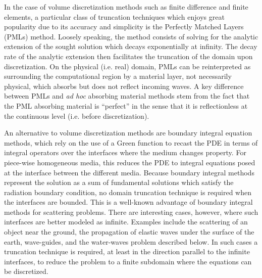 \documentclass[11pt]{article}
\begin{document}
In the case of volume discretization methods such as finite difference and
finite elements, a particular class of truncation techniques which enjoys great
popularity due to its accuracy and simplicity is the Perfectly Matched Layers
(PMLs) method. Loosely speaking, the method consists of solving for the analytic
extension of the sought solution which decays exponentially at infinity. The
decay rate of the analytic extension then facilitates the truncation of the
domain upon discretization. On the physical (i.e. real) domain, PMLs can be
reinterpreted as surrounding the computational region by a material layer, not
necessarily physical, which absorbs but does not reflect incoming waves. A key
difference between PMLs and \emph{ad hoc} absorbing material methods stem from
the fact that the PML absorbing material is ``perfect'' in the sense that it is
reflectionless at the continuous level (i.e. before discretization).

An alternative to volume discretization methods are boundary integral equation
methods, which rely on the use of a Green function to recast the PDE in terms of
integral operators over the interfaces where the medium changes property. For
piece-wise homogeneous media, this reduces the PDE to integral equations posed
at the interface between the different media. Because boundary integral methods
represent the solution as a sum of fundamental solutions which satisfy the
radiation boundary condition, no domain truncation technique is required when
the interfaces are bounded. This is a well-known advantage of boundary integral
methods for scattering problems. There are interesting cases, however, where
such interfaces are better modeled as infinite. Examples include the scattering
of an object near the ground, the propagation of elastic waves under the surface
of the earth, wave-guides, and the water-waves problem described below. In such
cases a truncation technique is required, at least in the direction parallel to
the infinite interfaces, to reduce the problem to a finite subdomain where the
equations can be discretized.
\end{document}
